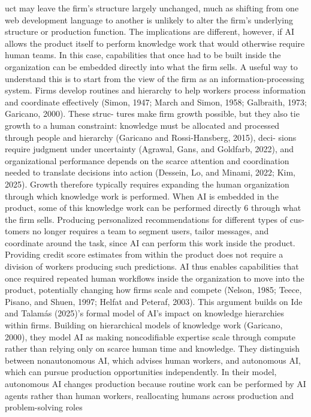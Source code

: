 uct may leave the firm’s structure largely unchanged, much as shifting from one web development
language to another is unlikely to alter the firm’s underlying structure or production function. The
implications are different, however, if AI allows the product itself to perform knowledge work that
would otherwise require human teams. In this case, capabilities that once had to be built inside the
organization can be embedded directly into what the firm sells.
A useful way to understand this is to start from the view of the firm as an information-processing
system. Firms develop routines and hierarchy to help workers process information and coordinate
effectively (Simon, 1947; March and Simon, 1958; Galbraith, 1973; Garicano, 2000). These struc-
tures make firm growth possible, but they also tie growth to a human constraint: knowledge must be
allocated and processed through people and hierarchy (Garicano and Rossi-Hansberg, 2015), deci-
sions require judgment under uncertainty (Agrawal, Gans, and Goldfarb, 2022), and organizational
performance depends on the scarce attention and coordination needed to translate decisions into
action (Dessein, Lo, and Minami, 2022; Kim, 2025). Growth therefore typically requires expanding
the human organization through which knowledge work is performed.
When AI is embedded in the product, some of this knowledge work can be performed directly
6
through what the firm sells. Producing personalized recommendations for different types of cus-
tomers no longer requires a team to segment users, tailor messages, and coordinate around the task,
since AI can perform this work inside the product. Providing credit score estimates from within
the product does not require a division of workers producing such predictions. AI thus enables
capabilities that once required repeated human workflows inside the organization to move into the
product, potentially changing how firms scale and compete (Nelson, 1985; Teece, Pisano, and Shuen,
1997; Helfat and Peteraf, 2003).
This argument builds on Ide and Talamás (2025)’s formal model of AI’s impact on knowledge
hierarchies within firms. Building on hierarchical models of knowledge work (Garicano, 2000), they
model AI as making noncodifiable expertise scale through compute rather than relying only on
scarce human time and knowledge. They distinguish between nonautonomous AI, which advises
human workers, and autonomous AI, which can pursue production opportunities independently.
In their model, autonomous AI changes production because routine work can be performed by AI
agents rather than human workers, reallocating humans across production and problem-solving roles
